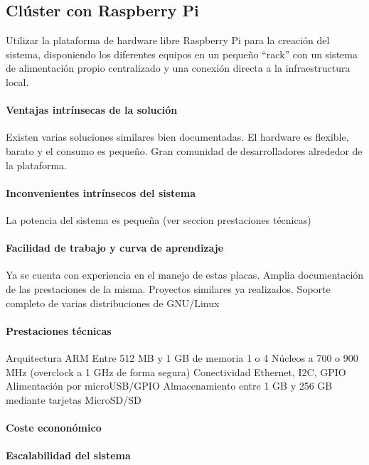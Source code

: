 \subsection{Clúster con Raspberry Pi}

Utilizar la plataforma de hardware libre Raspberry Pi para la creación del sistema, disponiendo los diferentes equipos en un pequeño ``rack'' con un sistema de alimentación propio centralizado y una conexión directa a la infraestructura local.

\paragraph{Ventajas intrínsecas de la solución}
Existen varias soluciones similares bien documentadas.
El hardware es flexible, barato y el consumo es pequeño.
Gran comunidad de desarrolladores alrededor de la plataforma.

\paragraph{Inconvenientes intrínsecos del sistema}

La potencia del sistema es pequeña (ver seccion prestaciones técnicas)

\paragraph{Facilidad de trabajo y curva de aprendizaje}

Ya se cuenta con experiencia en el manejo de estas placas.
Amplia documentación de las prestaciones de la misma.
Proyectos similares ya realizados.
Soporte completo de varias distribuciones de GNU/Linux

\paragraph{Prestaciones técnicas}

Arquitectura ARM
Entre 512 MB y 1 GB de memoria
1 o 4 Núcleos a 700 o 900 MHz (overclock a 1 GHz de forma segura)
Conectividad Ethernet, I2C, GPIO
Alimentación por microUSB/GPIO
Almacenamiento entre 1 GB y 256 GB mediante tarjetas MicroSD/SD

\paragraph{Coste econonómico}

\paragraph{Escalabilidad del sistema}

